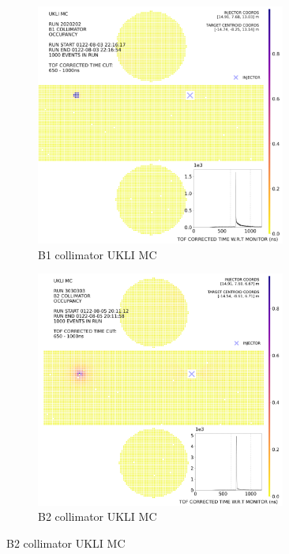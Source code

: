\begin{figure}[htp]
    \centering
    \caption{Monte Carlo simulations of the B1 - B5 collimator injectors}
    \label{fig:ukli_mc_coll}
    \begin{subfigure}{0.49\columnwidth}
    \centering
    \includegraphics[width=0.9\textwidth]{Figures/ukli_mc_B1.PNG}
    \caption{B1 collimator UKLI MC}
    \label{fig:time1}
    \end{subfigure}\hfill
    \begin{subfigure}{0.49\columnwidth}
    \centering
    \includegraphics[width=0.9\textwidth]{Figures/ukli_mc_B2.PNG}
    \caption{B2 collimator UKLI MC}
    \label{fig:time2}
    \end{subfigure}
    

\end{figure}
